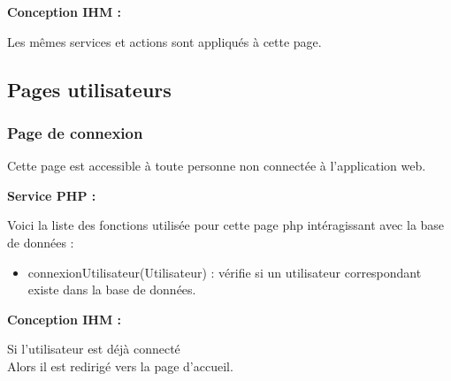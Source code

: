 			\begin{paragraphe}
				\textbf{Conception IHM :}
			\end{paragraphe}

			\begin{paragraphe}
				Les mêmes services et actions sont appliqués à cette page.
			\end{paragraphe}



	\clearpage

	\subsection{Pages utilisateurs}
		\subsubsection{Page de connexion}

			\begin{paragraphe}
				Cette page est accessible à toute personne non connectée à l'application web.
			\end{paragraphe}

			\begin{paragraphe}
				\textbf{Service PHP :}
			\end{paragraphe}

			\begin{paragraphe}
				Voici la liste des fonctions utilisée pour cette page php intéragissant avec la base de données :
				\begin{itemize}
					\item connexionUtilisateur(Utilisateur) : vérifie si un utilisateur correspondant existe dans la base de données.
				\end{itemize}
			\end{paragraphe}

			\begin{paragraphe}
				\textbf{Conception IHM :}
			\end{paragraphe}

			\begin{paragraphe}
				Si l'utilisateur est déjà connecté \\
				Alors il est redirigé vers la page d'accueil.
			\end{paragraphe}

